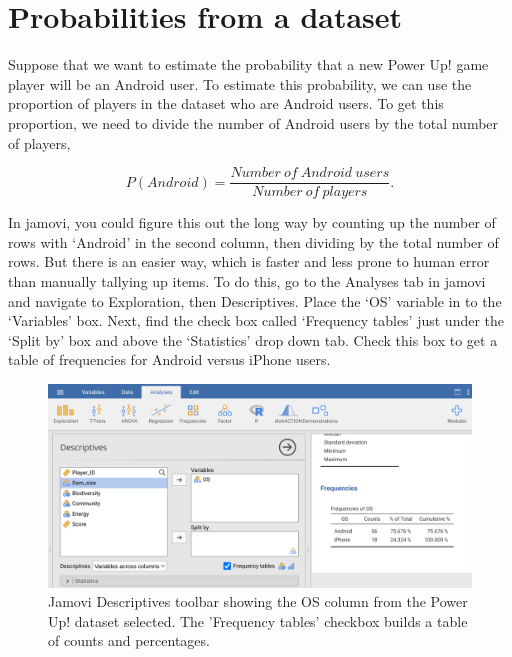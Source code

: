 \documentclass[
  openany]{krantz}
\begin{document}
\hypertarget{probabilities-from-a-dataset}{%
\section{Probabilities from a dataset}\label{probabilities-from-a-dataset}}

Suppose that we want to estimate the probability that a new Power Up! game player will be an Android user.
To estimate this probability, we can use the proportion of players in the dataset who are Android users.
To get this proportion, we need to divide the number of Android users by the total number of players,

\[P(Android) = \frac{Number\:of\:Android\:users}{Number\:of\:players}.\]

In jamovi, you could figure this out the long way by counting up the number of rows with `Android' in the second column, then dividing by the total number of rows.
But there is an easier way, which is faster and less prone to human error than manually tallying up items.
To do this, go to the Analyses tab in jamovi and navigate to Exploration, then Descriptives.
Place the `OS' variable in to the `Variables' box.
Next, find the check box called `Frequency tables' just under the `Split by' box and above the `Statistics' drop down tab.
Check this box to get a table of frequencies for Android versus iPhone users.

\begin{figure}
\includegraphics[width=1\linewidth]{img/jamovi_power_up_frequencies} \caption{Jamovi Descriptives toolbar showing the OS column from the Power Up! dataset selected. The 'Frequency tables' checkbox builds a table of counts and percentages.}\label{fig:unnamed-chunk-65}
\end{figure}
\end{document}
